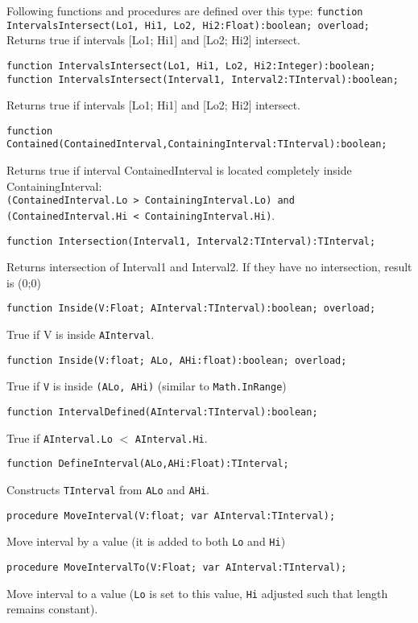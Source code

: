 \documentclass[12pt,a4paper,oneside]{article}
\newcommand{\code}[1]{\texttt{#1}}
\begin{document}
\noindent Following functions and procedures are defined over this type:
\vskip 6pt
\noindent\code{function IntervalsIntersect(Lo1, Hi1, Lo2, Hi2:Float):boolean; overload;\\}
Returns true if intervals [Lo1; Hi1] and [Lo2; Hi2] intersect.
\begin{verbatim}
function IntervalsIntersect(Lo1, Hi1, Lo2, Hi2:Integer):boolean;
function IntervalsIntersect(Interval1, Interval2:TInterval):boolean;
\end{verbatim}\vspace{-6pt}	
Returns true if intervals [Lo1; Hi1] and [Lo2; Hi2] intersect.
\begin{verbatim}
function Contained(ContainedInterval,ContainingInterval:TInterval):boolean;
\end{verbatim}\vspace{-6pt}	
Returns true if interval ContainedInterval is located completely inside ContainingInterval:\\
 \code{(ContainedInterval.Lo > ContainingInterval.Lo) and \\
 (ContainedInterval.Hi < ContainingInterval.Hi)}.
\begin{verbatim}
function Intersection(Interval1, Interval2:TInterval):TInterval;
\end{verbatim}	
Returns intersection of Interval1 and Interval2. If they have no intersection, result is (0;0)
\begin{verbatim}
function Inside(V:Float; AInterval:TInterval):boolean; overload;
\end{verbatim}\vspace{-6pt}	
True if V is inside \code{AInterval}.
\begin{verbatim}
function Inside(V:float; ALo, AHi:float):boolean; overload;
\end{verbatim}\vspace{-6pt}	
True if \code{V} is inside \code{(ALo, AHi)} (similar to \code{Math.InRange})
\begin{verbatim}
function IntervalDefined(AInterval:TInterval):boolean;
\end{verbatim}\vspace{-6pt}	
True if \code{AInterval.Lo} $<$ \code{AInterval.Hi}.
\begin{verbatim}
function DefineInterval(ALo,AHi:Float):TInterval;
\end{verbatim}\vspace{-6pt}	
Constructs \code{TInterval} from \code{ALo} and \code{AHi}.
\begin{verbatim}
procedure MoveInterval(V:float; var AInterval:TInterval);
\end{verbatim}\vspace{-6pt}	
Move interval by a value (it is added to both \code{Lo} and \code{Hi})
\begin{verbatim}
procedure MoveIntervalTo(V:Float; var AInterval:TInterval);
\end{verbatim}\vspace{-6pt}	
Move interval to a value (\code{Lo} is set to this value, \code{Hi} adjusted such that length remains constant).
\end{document}
